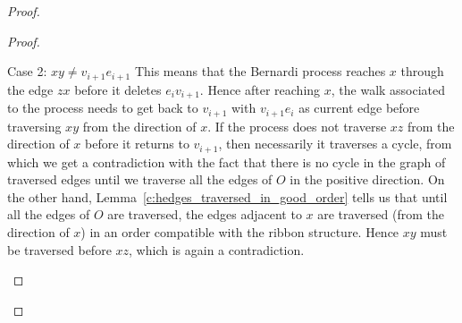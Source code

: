 \documentclass[10pt]{amsart}
\theoremstyle{definition}\newtheorem{defi}[theo]{Definition}
\theoremstyle{remark}\newtheorem{rema}[theo]{Remark}
\newenvironment{enonce*}[2][]{\par\smallskip\noindent\textbf{#2}.\par\nobreak}{\par\smallskip}
\begin{document}
\begin{proof}
\begin{proof}
\begin{enonce*}[remark]{Case 2: $xy\neq v_{i+1}e_{i+1}$}
This means that the Bernardi process reaches $x$ through the edge $zx$ before it deletes $e_iv_{i+1}$. Hence after reaching $x$, the walk associated to the process needs to get back to $v_{i+1}$ with $v_{i+1}e_i$ as current edge before traversing $xy$ from the direction of $x$. If the process does not traverse $xz$ from the direction of $x$ before it returns to $v_{i+1}$, then necessarily it traverses a cycle, from which we get a contradiction with the fact that there is no cycle in the graph of traversed edges until we traverse all the edges of $O$ in the positive direction. On the other hand, Lemma~\ref{c:hedges_traversed_in_good_order} tells us that until all the edges of $O$ are traversed, the edges adjacent to $x$ are traversed (from the direction of $x$) in an order compatible with the ribbon structure. Hence $xy$ must be traversed before $xz$, which is again a contradiction.\qedhere
\end{enonce*}
\end{proof}


\end{proof}
\end{document}
